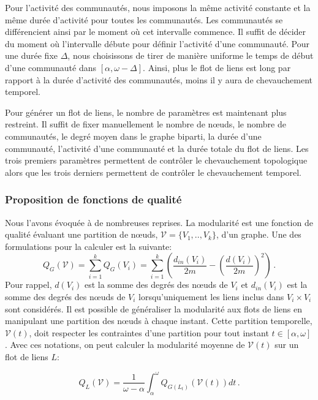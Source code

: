 Pour l'activité des communautés, nous imposons la même activité constante et la même durée d'activité pour toutes les communautés.
Les communautés se différencient ainsi par le moment où cet intervalle commence.
Il suffit de décider du moment où l'intervalle débute pour définir l'activité d'une communauté.
Pour une durée fixe $\Delta$, nous choisissons de tirer de manière uniforme le temps de début d'une communauté dans $[\alpha,\omega-\Delta]$.
Ainsi, plus le flot de liens est long par rapport à la durée d'activité des communautés, moins il y aura de chevauchement temporel.

\bigskip
Pour générer un flot de liens, le nombre de paramètres est maintenant plus restreint.
Il suffit de fixer manuellement le nombre de n\oe uds, le nombre de communautés, le degré moyen dans le graphe biparti, la durée d'une communauté, l'activité d'une communauté et la durée totale du flot de liens.
Les trois premiers paramètres permettent de contrôler le chevauchement topologique alors que les trois derniers permettent de contrôler le chevauchement temporel.

\subsubsection{Proposition de fonctions de qualité}

Nous l'avons évoquée à de nombreuses reprises.
La modularité est une fonction de qualité évaluant une partition de n\oe uds, $\mathcal{V}=\{V_1,..,V_k\}$, d'un graphe.
Une des formulations pour la calculer est la suivante:
\begin{equation}
Q_G(\mathcal{V}) =  \sum_{i=1}^{k} Q_G(V_i) =\sum_{i=1}^{k} \left( \dfrac{d_{in}(V_i)}{2m}- \left(\dfrac{d(V_i)}{2m}\right)^2\right)\,.
\end{equation}
Pour rappel, $d(V_i)$ est la somme des degrés des n\oe uds de $V_i$ et $d_{in}(V_i)$ est la somme des degrés des n\oe uds de $V_i$ lorsqu'uniquement les liens inclus dans $V_i \times V_i$ sont considérés.
Il est possible de généraliser la modularité aux flots de liens en manipulant une partition des n\oe uds à chaque instant.
Cette partition temporelle, $\mathcal{V}(t)$, doit respecter les contraintes d'une partition pour tout instant $t \in [\alpha,\omega]$.
Avec ces notations, on peut calculer la modularité moyenne de $\mathcal{V}(t)$ sur un flot de liens $L$:

\begin{equation}
Q_L(\mathcal{V}) = \dfrac{1}{\omega-\alpha} \int_{\alpha}^{\omega} Q_{G(L_t)}(\mathcal{V}(t)) dt\,.
\label{eq:temp_modu}
\end{equation}

